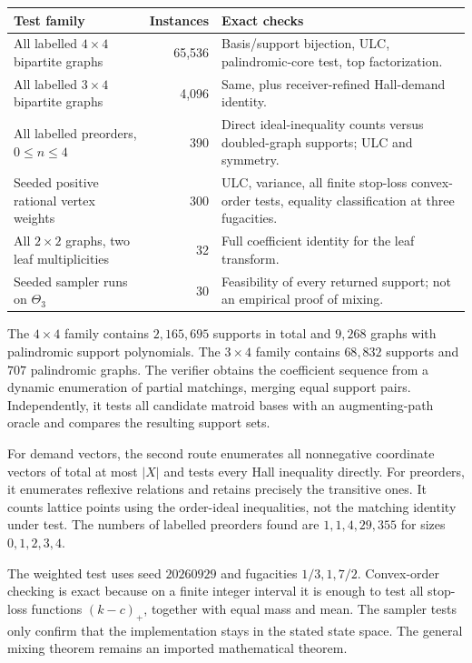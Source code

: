 \documentclass[11pt]{article}
\numberwithin{equation}{section}
\theoremstyle{definition}
\begin{document}
\begin{center}\small
\begin{tabularx}{\textwidth}{@{}>{\raggedright\arraybackslash}p{}rY@{}}
\toprule
Test family & Instances & Exact checks\\\midrule
All labelled $4\times4$ bipartite graphs & 65,536 & Basis/support bijection,
ULC, palindromic-core test, top factorization.\\
All labelled $3\times4$ bipartite graphs & 4,096 & Same, plus receiver-refined
Hall-demand identity.\\
All labelled preorders, $0\le n\le4$ & 390 & Direct ideal-inequality counts
versus doubled-graph supports; ULC and symmetry.\\
Seeded positive rational vertex weights & 300 & ULC, variance, all finite
stop-loss convex-order tests, equality classification at three fugacities.\\
All $2\times2$ graphs, two leaf multiplicities & 32 & Full coefficient identity
for the leaf transform.\\
Seeded sampler runs on $\Theta_3$ & 30 & Feasibility of every returned support;
not an empirical proof of mixing.\\\bottomrule
\end{tabularx}
\end{center}

The $4\times4$ family contains $2,165,695$ supports in total and $9,268$
graphs with palindromic support polynomials. The $3\times4$ family contains
$68,832$ supports and $707$ palindromic graphs. The verifier obtains the
coefficient sequence from a dynamic enumeration of partial matchings, merging
equal support pairs. Independently, it tests all candidate matroid bases with
an augmenting-path oracle and compares the resulting support sets.

For demand vectors, the second route enumerates all nonnegative coordinate
vectors of total at most $|X|$ and tests every Hall inequality directly.
For preorders, it enumerates reflexive relations and retains precisely the
transitive ones. It counts lattice points using the order-ideal inequalities,
not the matching identity under test. The numbers of labelled preorders found
are $1,1,4,29,355$ for sizes $0,1,2,3,4$.

The weighted test uses seed $20260929$ and fugacities $1/3,1,7/2$. Convex-order
checking is exact because on a finite integer interval it is enough to test
all stop-loss functions $(k-c)_+$, together with equal mass and mean. The
sampler tests only confirm that the implementation stays in the stated state
space. The general mixing theorem remains an imported mathematical theorem.
\end{document}
